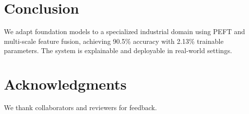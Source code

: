 \documentclass[conference]{IEEEtran}
\begin{document}
\section{Conclusion}
We adapt foundation models to a specialized industrial domain using PEFT and multi-scale feature fusion, achieving 90.5\% accuracy with 2.13\% trainable parameters. The system is explainable and deployable in real-world settings.

\section*{Acknowledgments}
We thank collaborators and reviewers for feedback.



\end{document}
